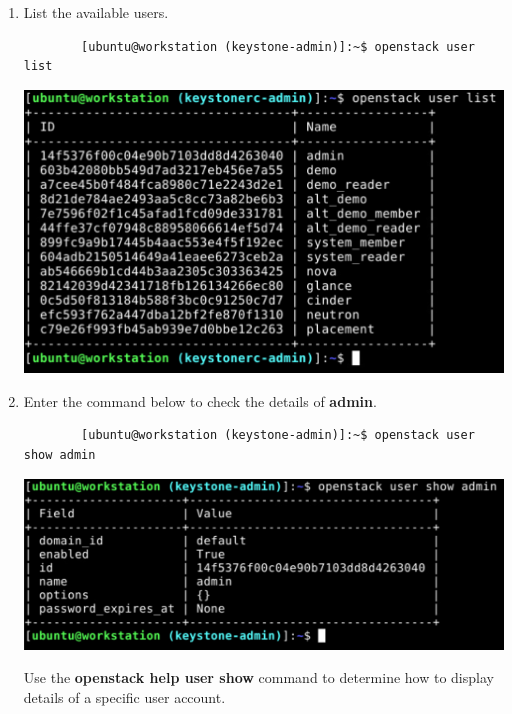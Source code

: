 \documentclass[letterpaper, 12pt]{article}
\begin{document}
\begin{enumerate}
    \item List the available users.
    \begin{lstlisting}
        [ubuntu@workstation (keystone-admin)]:~$ openstack user list
    \end{lstlisting}

    \begin{center}
        \includegraphics[width=\linewidth]{images/part2/step7.png}
    \end{center}

    \item Enter the command below to check the details of \textbf{admin}.
    \begin{lstlisting}
        [ubuntu@workstation (keystone-admin)]:~$ openstack user show admin
    \end{lstlisting}

    \begin{center}
        \includegraphics[width=\linewidth]{images/part2/step8.png}
    \end{center}

    \begin{tipbox}
        Use the \textbf{openstack help user show} command to determine how to display details of a specific user
        account.
    \end{tipbox}


\end{enumerate}
\end{document}
